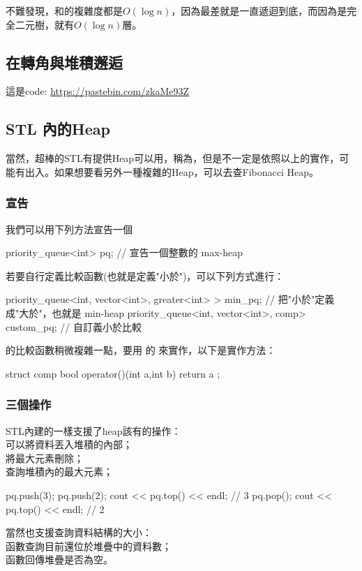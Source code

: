 不難發現，和的複雜度都是$O(\log n)$，因為最差就是一直遞迴到底，而因為是完全二元樹，就有$O(\log n)$層。
\subsection{在轉角與堆積邂逅}
這是code: \url{https://pastebin.com/zkaMe93Z}
\subsection{STL 內的Heap}
當然，超棒的STL有提供Heap可以用，稱為，但是不一定是依照以上的實作，可能有出入。如果想要看另外一種複雜的Heap，可以去查Fibonacci Heap。
\subsubsection{宣告}
我們可以用下列方法宣告一個
 \begin{C++}
priority_queue<int> pq; // 宣告一個整數的 max-heap
 \end{C++}
\indent\indent 若要自行定義比較函數(也就是定義"小於")，可以下列方式進行：
 \begin{C++}
priority_queue<int, vector<int>, greater<int> > min_pq;
// 把"小於"定義成"大於"，也就是 min-heap
priority_queue<int, vector<int>, comp> custom_pq; 
// 自訂義小於比較
 \end{C++}
\indent\indent{}的比較函數稍微複雜一點，要用  的  來實作，以下是實作方法：
\begin{C++}
struct comp{
    bool operator()(int a,int b){
        return a%
    }
};
\end{C++}
\subsubsection{三個操作}
STL內建的一樣支援了heap該有的操作：\\
\indent{}  可以將資料丟入堆積的內部；\\
\indent{} 將最大元素刪除；\\
\indent{} 查詢堆積內的最大元素；\\
\begin{C++}
pq.push(3);
pq.push(2);
cout << pq.top() << endl; // 3
pq.pop();
cout << pq.top() << endl; // 2
\end{C++}
\indent\indent 當然也支援查詢資料結構的大小：\\
\indent{} 函數查詢目前還位於堆疊中的資料數；\\
\indent{} 函數回傳堆疊是否為空。
